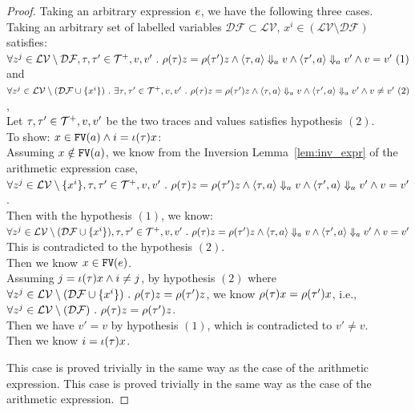 \begin{proof}
	Taking an arbitrary expression $e$,
	 we have the following three cases.
Taking an arbitrary set of labelled variables 
	$\mathcal{DF} \subset \mathcal{LV}$, $x^i \in (\mathcal{LV} \setminus \mathcal{DF})$ satisfies:
	\\
	$\forall z^j \in \mathcal{LV} \setminus \mathcal{DF}, \mathtt{\tau}, \mathtt{\tau}' \in \mathcal{T}^{+}, v, v' ~.~  
	\rho(\mathtt{\tau}) z = \rho(\mathtt{\tau}') z \land 
	\langle \mathtt{\tau}, a \rangle \Downarrow_a v \land \langle \mathtt{\tau}', a \rangle \Downarrow_a v' \land v = v' ~ (1)
	$
	\\
	and 
	$\forall z^j \in \mathcal{LV} \setminus (\mathcal{DF} \cup \{x^i\} ) ~.~  
	\exists \mathtt{\tau}, \mathtt{\tau}' \in \mathcal{T}^{+}, v, v'~.~  
	\rho(\mathtt{\tau}) z = \rho(\mathtt{\tau}') z \land 
	\langle \mathtt{\tau}, a \rangle \Downarrow_a v \land \langle \mathtt{\tau}', a \rangle \Downarrow_a v' \land v \neq v' ~ (2) 
	$,
	\\
	Let $\mathtt{\tau}, \mathtt{\tau}' \in \mathcal{T}^{+}, v, v'$ be the two traces and values satisfies hypothesis $(2)$.
	\\
	To show: $x \in \mathtt{FV}(a) \land i = \iota(\mathtt{\tau}) x$:
	\\
Assuming $x \notin \mathtt{FV}(a)$, we know from the Inversion Lemma~\ref{lem:inv_expr} of the arithmetic expression case,
\\
$\forall z^j \in \mathcal{LV} \setminus \{x^i\}, \mathtt{\tau}, \mathtt{\tau}' \in \mathcal{T}^{+}, v, v' ~.~  
\rho(\mathtt{\tau}) z = \rho(\mathtt{\tau}') z \land 
\langle \mathtt{\tau}, a \rangle \Downarrow_a v \land \langle \mathtt{\tau}', a \rangle \Downarrow_a v' \land v = v'$.
\\
Then with the hypothesis $(1)$, we know:
\\
$\forall z^j \in \mathcal{LV} \setminus (\mathcal{DF} \cup \{x^i\} ), \mathtt{\tau}, \mathtt{\tau}' \in \mathcal{T}^{+}, v, v'~.~  
\rho(\mathtt{\tau}) z = \rho(\mathtt{\tau}') z \land 
\langle \mathtt{\tau}, a \rangle \Downarrow_a v \land \langle \mathtt{\tau}', a \rangle \Downarrow_a v' \land v = v'$
\\
This is contradicted to the hypothesis $(2)$.
\\
Then we know $x \in \mathtt{FV}(e)$.
\\
Assuming $j = \iota(\mathtt{\tau}) x \land i \neq j$,
by hypothesis $(2)$ where 
$ \forall z^j \in \mathcal{LV} \setminus (\mathcal{DF} \cup \{x^i\} )  ~.~ \rho(\mathtt{\tau}) z = \rho(\mathtt{\tau}') z $, 
we know $\rho(\mathtt{\tau}) x = \rho(\mathtt{\tau}') x$, i.e., 
\\
$\forall z^j \in  \mathcal{LV} \setminus (\mathcal{DF}  ) ~.~  \rho(\mathtt{\tau}) z = \rho(\mathtt{\tau}') z$.
\\
Then we have $v' = v$ by hypothesis $(1)$, which is contradicted to $v' \neq v$.
\\
Then we know $i = \iota(\mathtt{\tau}) x $.

This case is proved trivially in the same way as the case of the arithmetic expression.
This case is proved trivially in the same way as the case of the arithmetic expression.
\end{proof}
